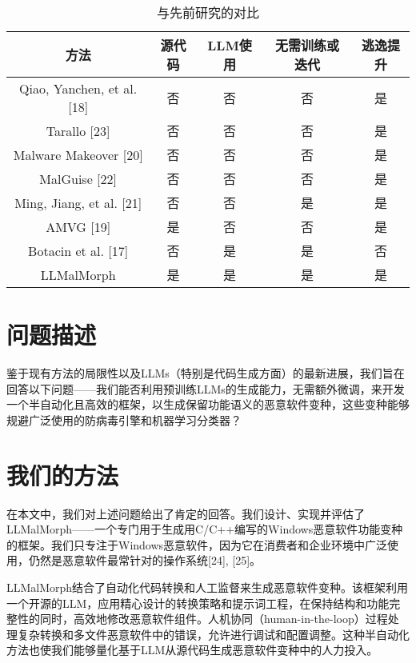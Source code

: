 \begin{table}[htbp]
	\centering
	\caption{与先前研究的对比}
	\label{tab:1.1}
	\begin{tabular*}{\textwidth}{@{\extracolsep{\fill}}ccccc}
		\toprule
		方法 & 源代码 & LLM使用 & 无需训练或迭代 & 逃逸提升 \\
		\midrule
		{Qiao, Yanchen, et al. [18]} & 否 & 否 & 否 & 是 \\
		{Tarallo [23]} & 否 & 否 & 否 & 是 \\
		{Malware Makeover [20]} & 否 & 否 & 否 & 是 \\
		{MalGuise [22]} & 否 & 否 & 否 & 是 \\
		{Ming, Jiang, et al. [21]} & 否 & 否 & 是 & 是 \\
		AMVG [19] & 是 & 否 & 否 & 是 \\
        Botacin et al. [17] & 否 & 是 & 是 & 否 \\
        LLMalMorph & 是 & 是 & 是 & 是 \\
		\bottomrule
	\end{tabular*}
\end{table}

\section{问题描述}
鉴于现有方法的局限性以及LLMs（特别是代码生成方面）的最新进展，我们旨在回答以下问题——我们能否利用预训练LLMs的生成能力，无需额外微调，来开发一个半自动化且高效的框架，以生成保留功能语义的恶意软件变种，这些变种能够规避广泛使用的防病毒引擎和机器学习分类器？

\section{我们的方法}
在本文中，我们对上述问题给出了肯定的回答。我们设计、实现并评估了LLMalMorph——一个专门用于生成用C/C++编写的Windows恶意软件功能变种的框架。我们只专注于Windows恶意软件，因为它在消费者和企业环境中广泛使用，仍然是恶意软件最常针对的操作系统[24], [25]。

LLMalMorph结合了自动化代码转换和人工监督来生成恶意软件变种。该框架利用一个开源的LLM，应用精心设计的转换策略和提示词工程，在保持结构和功能完整性的同时，高效地修改恶意软件组件。人机协同（human-in-the-loop）过程处理复杂转换和多文件恶意软件中的错误，允许进行调试和配置调整。这种半自动化方法也使我们能够量化基于LLM从源代码生成恶意软件变种中的人力投入。

